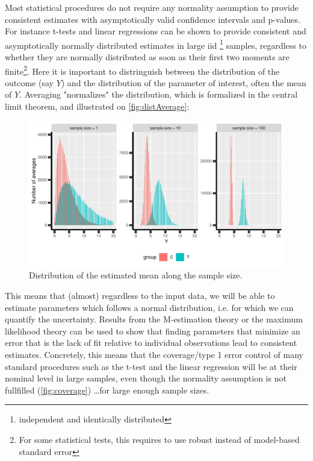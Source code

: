 \documentclass[12pt]{article}
\begin{document}
Most statistical procedures do not require any normality assumption to
provide consistent estimates with asymptotically valid confidence
intervals and p-values. For instance t-tests and linear regressions
can be shown to provide consistent and asymptotically normally
distributed estimates in large iid \footnote{independent and identically
distributed} samples, regardless to whether they are normally
distributed as soon as their first two moments are finite\footnote{For some
statistical tests, this requires to use robust instead of model-based
standard error}. Here it is important to distringuish between the
distribution of the outcome (say \(Y\)) and the distribution of the
parameter of interest, often the mean of \(Y\). Averaging "normalizes"
the distribution, which is formalized in the central limit theorem,
and illustrated on \autoref{fig:distAverage}:

\begin{figure}[!h]
\centering
\includegraphics[width=\textwidth]{./figures/examples-histAverage.pdf}
\caption{\label{fig:distAverage}Distribution of the estimated mean along the sample size.}
\end{figure}

This means that (almost) regardless to the input data, we will be able
to estimate parameters which follows a normal distribution, i.e. for
which we can quantify the uncertainty. Results from the M-estimation
theory or the maximum likelihood theory can be used to show that
finding parameters that minimize an error that is the lack of fit
relative to individual observations lead to consistent
estimates. Concretely, this means that the coverage/type 1 error
control of many standard procedures such as the t-test and the linear
regression will be at their nominal level in large samples, even
though the normality assumption is not fullfilled
(\autoref{fig:coverage}) \ldots for large enough sample sizes.
\end{document}
